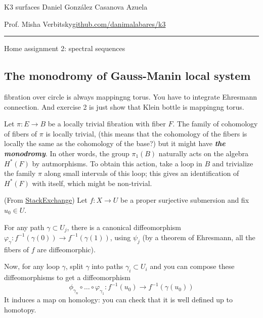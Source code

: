 

\usepackage[style=authortitle-terse,backend=bibtex]{biblatex}


\setcounter{secnumdepth}{0}



\begin{minipage}{\textwidth}
	\begin{minipage}{1\textwidth}
		K3 surfaces \hfill Daniel González Casanova Azuela
		
		{\small Prof. Misha Verbitsky\hfill\href{https://github.com/danimalabares/k3}{github.com/danimalabares/k3}}
	\end{minipage}
\end{minipage}\vspace{.2cm}\hrule

\vspace{10pt}
{\huge Home assignment 2: spectral sequences}

\setcounter{section}{2}
\subsection{The monodromy of Gauss-Manin local system}

fibration over circle is always mappingng torus. You have to integrate Ehresmann connection.
And exercise 2 is just show that Klein bottle is mappingng torus.

\begin{manualdef}{2.1}
	Let $\pi:E\to B$ be a locally trivial fibration with fiber $F$. The family of cohomology of fibers of $\pi$ is locally trivial, {\color{magenta}(this means that the cohomology of the fibers is locally the same as the cohomology of the base?)} but it might have \textit{\textbf{the monodromy}}. In other words, the group $\pi_{1}(B)$ naturally acts on the algebra $H^{*}(F)$ by autmorphisms. To obtain this action, take a loop in $B$ and trivialize the family $ \pi$ along small intervals of this loop; this gives an identification of $H^{*}(F)$ with itself, which might be non-trivial.
\end{manualdef}

\begin{remark}
	(From \href{https://math.stackexchange.com/questions/2845794/monodromy-on-cohomology}{StackExchange}) Let $f:X\to U$ be a proper surjective submersion and fix $u_0\in U$.

	For any path $\gamma \subset U_j$, there is a canonical diffeomorphism $\varphi_\gamma:f^{-1}(\gamma(0))\to f^{-1}(\gamma(1))$, using $\psi_j$ (by a theorem of Ehresmann, all the fibers of $f$ are diffeomorphic).

	Now, for any loop $\gamma$, split $\gamma$ into paths $\gamma_i\subset U_i$ and you can compose these diffeomorphisms to get a diffeomorphism
	 \[\phi_{\gamma_n}\circ \ldots\circ \varphi_{\gamma_1}:f^{-1}(u_0)\to f^{-1}(\gamma(u_0))\]
	 It induces a map on homology: you can check that it is well defined up to homotopy.
\end{remark}

